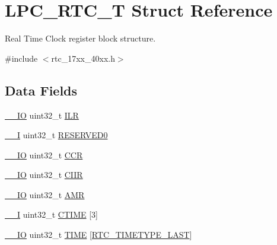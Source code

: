 \hypertarget{structLPC__RTC__T}{\section{L\-P\-C\-\_\-\-R\-T\-C\-\_\-\-T Struct Reference}
\label{structLPC__RTC__T}
}


Real Time Clock register block structure.  




{\ttfamily \#include $<$rtc\-\_\-17xx\-\_\-40xx.\-h$>$}

\subsection*{Data Fields}
\begin{DoxyCompactItemize}
\item 
\hyperlink{core__cm3_8h_aec43007d9998a0a0e01faede4133d6be}{\-\_\-\-\_\-\-I\-O} uint32\-\_\-t \hyperlink{structLPC__RTC__T_a6e1debaa7074a0fae4767a70f9abff29}{I\-L\-R}
\item 
\hyperlink{core__cm3_8h_af63697ed9952cc71e1225efe205f6cd3}{\-\_\-\-\_\-\-I} uint32\-\_\-t \hyperlink{structLPC__RTC__T_a94d0c8bf3402d34aac9170bac01bb4fb}{R\-E\-S\-E\-R\-V\-E\-D0}
\item 
\hyperlink{core__cm3_8h_aec43007d9998a0a0e01faede4133d6be}{\-\_\-\-\_\-\-I\-O} uint32\-\_\-t \hyperlink{structLPC__RTC__T_ab2117371a628879dbc56f2c1774207b5}{C\-C\-R}
\item 
\hyperlink{core__cm3_8h_aec43007d9998a0a0e01faede4133d6be}{\-\_\-\-\_\-\-I\-O} uint32\-\_\-t \hyperlink{structLPC__RTC__T_ac9d2627afcf203dccde2675c6c74d673}{C\-I\-I\-R}
\item 
\hyperlink{core__cm3_8h_aec43007d9998a0a0e01faede4133d6be}{\-\_\-\-\_\-\-I\-O} uint32\-\_\-t \hyperlink{structLPC__RTC__T_af8b21ae5aa8bedcb0a1dd918678ee389}{A\-M\-R}
\item 
\hyperlink{core__cm3_8h_af63697ed9952cc71e1225efe205f6cd3}{\-\_\-\-\_\-\-I} uint32\-\_\-t \hyperlink{structLPC__RTC__T_a66b166ccd4abefe149e6e3ef6d833554}{C\-T\-I\-M\-E} \mbox{[}3\mbox{]}
\item 
\hyperlink{core__cm3_8h_aec43007d9998a0a0e01faede4133d6be}{\-\_\-\-\_\-\-I\-O} uint32\-\_\-t \hyperlink{structLPC__RTC__T_adb4fbf67e8231188ed424c3ce226919e}{T\-I\-M\-E} \mbox{[}\hyperlink{group__RTC__17XX__40XX_gga8144898fe628404d396db06dc8aac0e0a0d4fafef57b6ef363f9a0875ff339cad}{R\-T\-C\-\_\-\-T\-I\-M\-E\-T\-Y\-P\-E\-\_\-\-L\-A\-S\-T}\mbox{]}
\item 

\end{DoxyCompactItemize}
